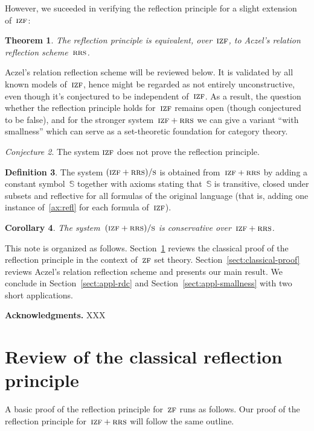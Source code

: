 \documentclass[oneside,reqno]{amsart}
\theoremstyle{definition}
\newtheorem{defn}{Definition}[section]
\theoremstyle{plain}
\newtheorem{cor}[defn]{Corollary}
\newtheorem{thm}[defn]{Theorem}
\theoremstyle{remark}
\newtheorem{conjecture}[defn]{Conjecture}
\renewcommand{\SS}{\mathbb{S}}
\renewcommand{\_}{\mathpunct{.}\,}
\newcommand{\?}{\,{:}\,}
\newcommand{\ZF}{\textsc{zf}}
\newcommand{\IZF}{\textsc{izf}}
\newcommand{\RRS}{\textsc{rrs}}
\newcommand{\ES}{(\IZF+\RRS)/\textsc{s}}
\begin{document}
However, we suceeded in verifying the reflection principle for a slight
extension of~$\IZF$:

\begin{thm}The reflection principle is equivalent, over~$\IZF$, to Aczel's relation reflection
scheme~$\RRS$.\end{thm}

Aczel's relation reflection scheme will be reviewed below. It is validated by
all known models of~$\IZF$, hence might be regarded as not entirely
unconstructive, even though it's conjectured to be independent of~$\IZF$. As a
result, the question whether the reflection principle holds for~$\IZF$ remains
open (though conjectured to be false), and for the stronger system~$\IZF+\RRS$
we can give a variant ``with smallness'' which can serve as a set-theoretic
foundation for category theory.

\begin{conjecture}The system $\IZF$ does not prove the reflection
principle.\end{conjecture}

\begin{defn}The system $\ES$ is obtained from~$\IZF+\RRS$ by
adding a constant symbol~$\SS$ together with axioms
stating that~$\SS$ is transitive, closed under subsets and reflective for all
formulas of the original language (that is, adding one instance
of~\eqref{ax:refl} for each formula of~$\IZF$).\end{defn}

\begin{cor}The system~$\ES$ is conservative
over~$\IZF+\RRS$.\end{cor}

This note is organized as follows. Section~\ref{sect:review} reviews the
classical proof of the reflection principle in the context of~$\ZF$ set theory.
Section~\ref{sect:classical-proof} reviews Aczel's relation reflection scheme
and presents our main result. We conclude in Section~\ref{sect:appl-rdc} and
Section~\ref{sect:appl-smallness} with two short applications.

\textbf{Acknowledgments.} XXX


\section{Review of the classical reflection principle}
\label{sect:review}

A basic proof of the reflection principle for~$\ZF$ runs as follows. Our proof
of the reflection principle for~$\IZF+\RRS$ will follow the same outline.
\end{document}
